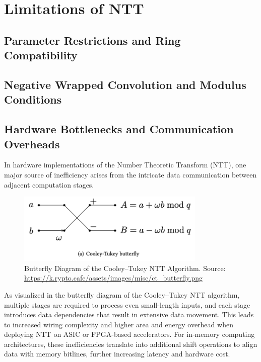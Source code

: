 \documentclass[12pt]{article}
\begin{document}
\section{Limitations of NTT}

\subsection{Parameter Restrictions and Ring Compatibility}

\subsection{Negative Wrapped Convolution and Modulus Conditions}

\subsection{Hardware Bottlenecks and Communication Overheads}

In hardware implementations of the Number Theoretic Transform (NTT), 
one major source of inefficiency arises from the intricate data communication between adjacent computation stages. 

\begin{figure}[h]
    \centering
    \includegraphics[width=0.8\textwidth]{Final_img/CT_butterfly.png}
    \caption{Butterfly Diagram of the Cooley–Tukey NTT Algorithm. Source: \url{https://k.rypto.cafe/assets/images/misc/ct_butterfly.png}}
    \label{fig:butterfly}
\end{figure}

As visualized in the butterfly diagram of the Cooley–Tukey NTT algorithm, 
multiple stages are required to process even small-length inputs, 
and each stage introduces data dependencies that result in extensive data movement. 
This leads to increased wiring complexity and higher area and energy overhead when deploying NTT on ASIC or FPGA-based accelerators. 
For in-memory computing architectures, 
these inefficiencies translate into additional shift operations to align data with memory bitlines, 
further increasing latency and hardware cost.
\end{document}
